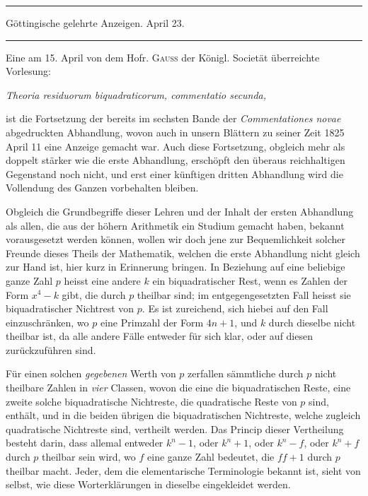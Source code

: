 \clearpage
{}%
\begin{center}
\rule{.82\linewidth}{.35pt}\par
Göttingische gelehrte Anzeigen. April 23.\par
\rule{.82\linewidth}{.35pt}
\end{center}
Eine am 15. April von dem Hofr. \textsc{Gauss} der Königl. Societät überreichte Vorlesung:
\begin{center}\itshape
Theoria residuorum biquadraticorum, commentatio secunda,
\end{center}
ist die Fortsetzung der bereits im sechsten Bande der \emph{Commentationes novae} abgedruckten Abhandlung, wovon auch in unsern Blättern zu seiner Zeit 1825 April 11 eine Anzeige gemacht war. Auch diese Fortsetzung, obgleich mehr als doppelt stärker wie die erste Abhandlung, erschöpft den überaus reichhaltigen Gegenstand noch nicht, und erst einer künftigen dritten Abhandlung wird die Vollendung des Ganzen vorbehalten bleiben.

Obgleich die Grundbegriffe dieser Lehren und der Inhalt der ersten Abhandlung als allen, die aus der höhern Arithmetik ein Studium gemacht haben, bekannt vorausgesetzt werden können, wollen wir doch jene zur Bequemlichkeit solcher Freunde dieses Theils der Mathematik, welchen die erste Abhandlung nicht gleich zur Hand ist, hier kurz in Erinnerung bringen. In Beziehung auf eine beliebige ganze Zahl $p$ heisst eine andere $k$ ein biquadratischer Rest, wenn es Zahlen der Form $x^4-k$ gibt, die durch $p$ theilbar sind; im entgegengesetzten Fall heisst sie biquadratischer Nichtrest von $p$. Es ist zureichend, sich hiebei auf den Fall einzuschränken, wo $p$ eine Primzahl der Form $4n+1$, und $k$ durch
%
dieselbe nicht theilbar ist, da alle andere Fälle entweder für sich klar, oder auf diesen zurückzuführen sind.

Für einen solchen \emph{gegebenen} Werth von $p$ zerfallen sämmtliche durch $p$ nicht theilbare Zahlen in \emph{vier} Classen, wovon die eine die biquadratischen Reste, eine zweite solche biquadratische Nichtreste, die quadratische Reste von $p$ sind, enthält, und in die beiden übrigen die biquadratischen Nichtreste, welche zugleich quadratische Nichtreste sind, vertheilt werden. Das Princip dieser Vertheilung besteht darin, dass allemal entweder $k^n-1$, oder $k^n+1$, oder $k^n-f$, oder $k^n+f$ durch $p$ theilbar sein wird, wo $f$ eine ganze Zahl bedeutet, die $ff+1$ durch $p$ theilbar macht. Jeder, dem die elementarische Terminologie bekannt ist, sieht von selbst, wie diese Worterklärungen in dieselbe eingekleidet werden.

